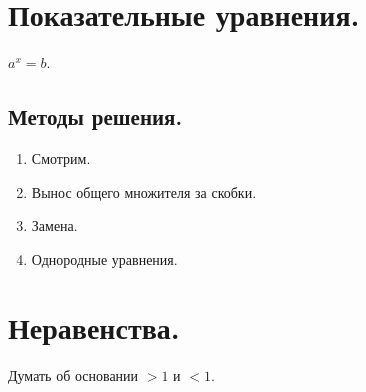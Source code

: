 \documentclass[12pt]{article}
\begin{document}
	\section{Показательные уравнения.}
	\begin{definition}
		$a^x = b$.
	\end{definition}
	\subsection{Методы решения.}
	\begin{enumerate}
		\item Смотрим.
		\item Вынос общего множителя за скобки.
		\item Замена.
		\item Однородные уравнения.
	\end{enumerate}
	\section{Неравенства.}
	\begin{note}
		Думать об основании $> 1$ и $< 1$.
	\end{note}
\end{document}
